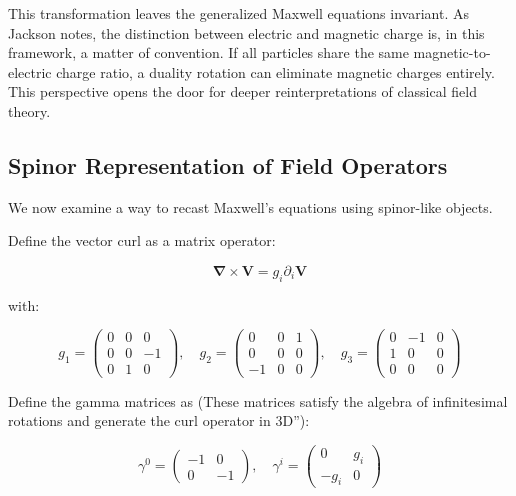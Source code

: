 \documentclass {article}
\renewcommand\vec{\mathbf}
\let\OldS\nabla
\renewcommand{\nabla}{\boldsymbol{\OldS}}
\begin{document}
This transformation leaves the generalized Maxwell equations invariant. As Jackson notes, the distinction between electric and magnetic charge is, in this framework, a matter of convention. If all particles share the same magnetic-to-electric charge ratio, a duality rotation can eliminate magnetic charges entirely. This perspective opens the door for deeper reinterpretations of classical field theory.

\subsection{Spinor Representation of Field Operators}

We now examine a way to recast Maxwell’s equations using spinor-like objects.

Define the vector curl as a matrix operator:

\begin{equation}
\nabla \times \vec{V} = g_i \partial_i \vec{V}
\end{equation}

with:

\begin{equation}
g_1 = \begin{pmatrix}
0 & 0 & 0 \\
0 & 0 & -1 \\
0 & 1 & 0
\end{pmatrix}, \quad
g_2 = \begin{pmatrix}
0 & 0 & 1 \\
0 & 0 & 0 \\
-1 & 0 & 0
\end{pmatrix}, \quad
g_3 = \begin{pmatrix}
0 & -1 & 0 \\
1 & 0 & 0 \\
0 & 0 & 0
\end{pmatrix}
\end{equation}

Define the gamma matrices as (These matrices satisfy the algebra of infinitesimal rotations and generate the curl operator in 3D”):

\begin{equation}
\gamma^0 = \begin{pmatrix}
-1 & 0 \\
0 & -1
\end{pmatrix}, \quad
\gamma^i = \begin{pmatrix}
0 & g_i \\
-g_i & 0
\end{pmatrix}
\end{equation}
\end{document}
